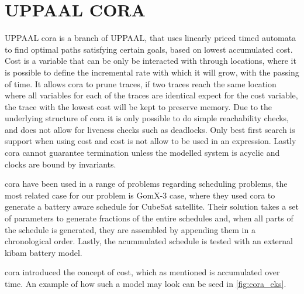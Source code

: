 \section{UPPAAL CORA}\label{sec:upp_cora}
UPPAAL \acrfull{cora} is a branch of UPPAAL, that uses linearly priced timed automata to find optimal paths satisfying certain goals, based on lowest accumulated cost\cite{cs_cora}. Cost is a variable that can be only be interacted with through locations, where it is possible to define the incremental rate with which it will grow, with the passing of time. It allows \gls{cora} to prune traces, if two traces reach the same location where all variables for each of the traces are identical expect for the cost variable, the trace with the lowest cost will be kept to preserve memory. Due to the underlying structure of \gls{cora} it is only possible to do simple reachability checks, and does not allow for liveness checks such as deadlocks. Only best first search is support when using cost and cost is not allow to be used in an expression. Lastly \gls{cora} cannot guarantee termination unless the modelled system is acyclic and clocks are bound by invariants.

\Gls{cora} have been used in a range of problems regarding scheduling problems, the most related case for our problem is GomX-3 case, where they used \gls{cora} to generate a battery aware schedule for CubeSat satellite. Their solution takes a set of parameters to generate fractions of the entire schedules and, when all parts of the schedule is generated, they are assembled by appending them in a chronological order. Lastly, the acummulated schedule is tested with an external \gls{kibam} battery model.

\Gls{cora} introduced the concept of cost, which as mentioned is accumulated over time. An example of how such a model may look can be seed in \cref{fig:cora_eks}.

